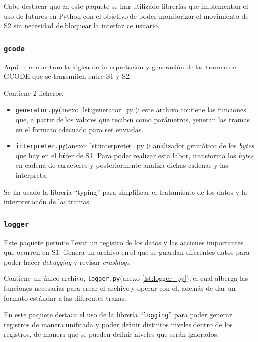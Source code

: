Cabe destacar que en este paquete se han utilizado librerías  que implementan el uso de futuros en Python con el objetivo de poder monitorizar el movimiento de \ac{S2} sin necesidad de bloquear la interfaz de usuario.

\subsubsection{\texttt{gcode}}

Aquí se encuentran la lógica de interpretación y generación de las tramas de GCODE que se transmiten entre \ac{S1} y \ac{S2}.

Contiene 2 ficheros:

\begin{itemize}
    \item \texttt{generator.py}(anexo \ref{lst:generator_py}): este archivo contiene las funciones que, a partir de los valores que reciben como parámetros, generan las tramas en el formato adecuado para ser enviadas.
    
    \item \texttt{interpreter.py}(anexo \ref{lst:interpreter_py}): analizador gramático de los \textit{bytes} que hay en el búfer de \ac{S1}.
    Para poder realizar esta labor, transforma los \textit{bytes} en cadena de caracteres y posteriormente analiza dichas cadenas y las interpreta.
\end{itemize}

Se ha usado la librería ``typing'' para simplificar el tratamiento de los datos y la interpretación de las tramas.

\subsubsection{\texttt{logger}}

Este paquete permite llevar un registro de los datos y las acciones importantes que ocurren en \ac{S1}. Genera un archivo en el que se guardan diferentes datos para poder hacer \textit{debugging} y revisar \textit{crashlogs}.

Contiene un único archivo, \texttt{logger.py}(anexo \ref{lst:logger_py}), el cual alberga las funciones necesarias para crear el archivo y operar con él, además de dar un formato estándar a las diferentes trazas.

En este paquete destaca el uso de la librería ``\texttt{logging}'' para poder generar registros de manera unificada y poder definir distintos niveles dentro de los registros, de manera que se pueden definir
niveles que serán ignorados.

